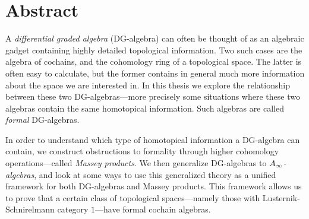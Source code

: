 

\section{Abstract}

A \textit{differential graded algebra} (DG-algebra) can often be thought of as an algebraic gadget containing highly detailed topological information. Two such cases are the algebra of cochains, and the cohomology ring of a topological space. The latter is often easy to calculate, but the former contains in general much more information about the space we are interested in. In this thesis we explore the relationship between these two DG-algebras---more precisely some situations where these two algebras contain the same homotopical information. Such algebras are called \textit{formal} DG-algebras.

In order to understand which type of homotopical information a DG-algebra can contain, we construct obstructions to formality through higher cohomology operations---called \textit{Massey products}. We then generalize DG-algebras to \textit{$A_{\infty}$-algebras}, and look at some ways to use this generalized theory as a unified framework for both DG-algebras and Massey products. This framework allows us to prove that a certain class of topological spaces---namely those with Lusternik-Schnirelmann category $1$---have formal cochain algebras. 